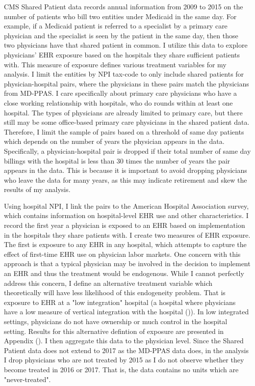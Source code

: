 \documentclass[11pt]{article}
\begin{document}
CMS Shared Patient data records annual information from 2009 to 2015 on the number of patients who bill two entities under Medicaid in the same day. For example, if a Medicaid patient is referred to a specialist by a primary care physician and the specialist is seen by the patient in the same day, then those two physicians have that shared patient in common. I utilize this data to explore physicians' EHR exposure based on the hospitals they share sufficient patients with. This measure of exposure defines various treatment variables for my analysis. I limit the entities by NPI tax-code to only include shared patients for physician-hospital pairs, where the physicians in these pairs match the physicians from MD-PPAS. I care specifically about primary care physicians who have a close working relationship with hospitals, who do rounds within at least one hospital. The types of physicians are already limited to primary care, but there still may be some office-based primary care physicians in the shared patient data. Therefore, I limit the sample of pairs based on a threshold of same day patients which depends on the number of years the physician appears in the data. Specifically, a physician-hospital pair is dropped if their total number of same day billings with the hospital is less than 30 times the number of years the pair appears in the data. This is because it is important to avoid dropping physicians who leave the data for many years, as this may indicate retirement and skew the results of my analysis.

Using hospital NPI, I link the pairs to the American Hospital Association survey, which contains information on hospital-level EHR use and other characteristics. I record the first year a physician is exposed to an EHR based on implementation in the hospitals they share patients with. I create two measures of EHR exposure. The first is exposure to any EHR in any hospital, which attempts to capture the effect of first-time EHR use on physician labor markets. One concern with this approach is that a typical physician may be involved in the decision to implement an EHR and thus the treatment would be endogenous. While I cannot perfectly address this concern, I define an alternative treatment variable which theoretically will have less likelihood of this endogeneity problem. That is exposure to EHR at a "low integration" hospital (a hospital where physicians have a low measure of vertical integration with the hospital (\cite{madison2004hospital})). In low integrated settings, physicians do not have ownership or much control in the hospital setting. Results for this alternative defintion of exposure are presented in Appendix (). I then aggregate this data to the physician level. Since the Shared Patient data does not extend to 2017 as the MD-PPAS data does, in the analysis I drop physicians who are not treated by 2015 as I do not observe whether they become treated in 2016 or 2017. That is, the data contains no units which are "never-treated".
\end{document}
